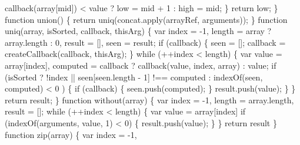 \begin{DoxyCodeInclude}
{{\textcolor{stringliteral}{      callback(array[mid]) < value}
\textcolor{stringliteral}{        ? low = mid + 1}
\textcolor{stringliteral}{        : high = mid;}
\textcolor{stringliteral}{    \}}
\textcolor{stringliteral}{    return low;}
\textcolor{stringliteral}{  \}}
\textcolor{stringliteral}{}
\textcolor{stringliteral}{  function union() \{}
\textcolor{stringliteral}{    return uniq(concat.apply(arrayRef, arguments));}
\textcolor{stringliteral}{  \}}
\textcolor{stringliteral}{}
\textcolor{stringliteral}{  function uniq(array, isSorted, callback, thisArg) \{}
\textcolor{stringliteral}{    var index = -1,}
\textcolor{stringliteral}{        length = array ? array.length : 0,}
\textcolor{stringliteral}{        result = [],}
\textcolor{stringliteral}{        seen = result;}
\textcolor{stringliteral}{}
\textcolor{stringliteral}{    if (callback) \{}
\textcolor{stringliteral}{      seen = [];}
\textcolor{stringliteral}{      callback = createCallback(callback, thisArg);}
\textcolor{stringliteral}{    \}}
\textcolor{stringliteral}{    while (++index < length) \{}
\textcolor{stringliteral}{      var value = array[index],}
\textcolor{stringliteral}{          computed = callback ? callback(value, index, array) : value;}
\textcolor{stringliteral}{}
\textcolor{stringliteral}{      if (isSorted}
\textcolor{stringliteral}{            ? !index || seen[seen.length - 1] !== computed}
\textcolor{stringliteral}{            : indexOf(seen, computed) < 0}
\textcolor{stringliteral}{          ) \{}
\textcolor{stringliteral}{        if (callback) \{}
\textcolor{stringliteral}{          seen.push(computed);}
\textcolor{stringliteral}{        \}}
\textcolor{stringliteral}{        result.push(value);}
\textcolor{stringliteral}{      \}}
\textcolor{stringliteral}{    \}}
\textcolor{stringliteral}{    return result;}
\textcolor{stringliteral}{  \}}
\textcolor{stringliteral}{}
\textcolor{stringliteral}{  function without(array) \{}
\textcolor{stringliteral}{    var index = -1,}
\textcolor{stringliteral}{        length = array.length,}
\textcolor{stringliteral}{        result = [];}
\textcolor{stringliteral}{}
\textcolor{stringliteral}{    while (++index < length) \{}
\textcolor{stringliteral}{      var value = array[index]}
\textcolor{stringliteral}{      if (indexOf(arguments, value, 1) < 0) \{}
\textcolor{stringliteral}{        result.push(value);}
\textcolor{stringliteral}{      \}}
\textcolor{stringliteral}{    \}}
\textcolor{stringliteral}{    return result}
\textcolor{stringliteral}{  \}}
\textcolor{stringliteral}{}
\textcolor{stringliteral}{  function zip(array) \{}
\textcolor{stringliteral}{    var index = -1,}
}}
\end{DoxyCodeInclude}
